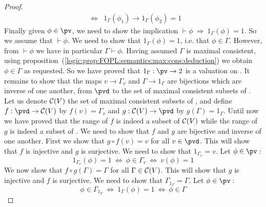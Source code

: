 \begin{proof}
\begin{eqnarray*}
    &\Leftrightarrow&1_{\Gamma}(\phi_{1})\to1_{\Gamma}(\phi_{2})=1
    \end{eqnarray*}
Finally given $\phi\in\pv$, we need to show the implication
$\vdash\phi\ \Rightarrow\ 1_{\Gamma}(\phi)=1$. So we assume that
$\vdash\phi$. We need to show that $1_{\Gamma}(\phi)=1$, i.e. that
$\phi\in\Gamma$. However, from $\vdash\phi$ we have in particular
$\Gamma\vdash\phi$. Having assumed $\Gamma$ is maximal consistent,
using
proposition~(\ref{logic:prop:FOPL:semantics:max:cons:deduction}) we
obtain $\phi\in\Gamma$ as requested. So we have proved that
$1_{\Gamma}:\pv\to 2$ is a valuation on \pv. It remains to show that
the maps $v\to\Gamma_{v}$ and $\Gamma\to 1_{\Gamma}$ are bijections
which are inverse of one another, from $\pvd$ to the set of maximal
consistent subsets of \pv. Let us denote ${\cal C}(V)$ the set of
maximal consistent subsets of \pv, and define $f:\pvd\to{\cal C}(V)$
by $f(v)=\Gamma_{v}$ and $g:{\cal C}(V)\to\pvd$ by
$g(\Gamma)=1_{\Gamma}$. Until now we have proved that the range of
$f$ is indeed a subset of ${\cal C}(V)$ while the range of $g$ is
indeed a subset of \pvd. We need to show that $f$ and $g$ are
bijective and inverse of one another. First we show that $g\circ
f(v)=v$ for all $v\in\pvd$. This will show that $f$ is injective and
$g$ is surjective. We need to show that $1_{\Gamma_{v}}=v$. Let
$\phi\in\pv$\,:
    \[
    1_{\Gamma_{v}}(\phi)=1\ \Leftrightarrow\ \phi\in\Gamma_{v}\
    \Leftrightarrow\ v(\phi)=1
    \]
We now show that $f\circ g(\Gamma)=\Gamma$ for all $\Gamma\in{\cal
C}(V)$. This will show that $g$ is injective and $f$ is surjective.
We need to show that $\Gamma_{1_{\Gamma}}=\Gamma$. Let
$\phi\in\pv$\,:
    \[
    \phi\in\Gamma_{1_{\Gamma}}\ \Leftrightarrow\ 1_{\Gamma}(\phi)=1\
    \Leftrightarrow\ \phi\in\Gamma
    \]
\end{proof}
